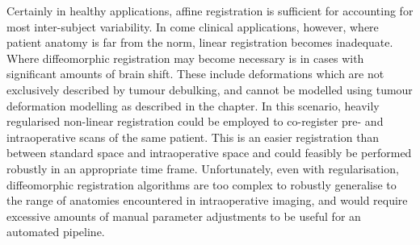 Certainly in healthy applications, affine registration is sufficient for accounting for most inter-subject variability.
In come clinical applications, however, where patient anatomy is far from the norm, linear registration becomes inadequate.
Where diffeomorphic registration may become necessary is in cases with significant amounts of brain shift.
These include deformations which are not exclusively described by tumour debulking, and cannot be modelled using tumour deformation modelling as described in the  chapter.
In this scenario, heavily regularised non-linear registration could be employed to co-register pre- and intraoperative scans of the same patient.
This is an easier registration than between standard space and intraoperative space and could feasibly be performed robustly in an appropriate time frame.
Unfortunately, even with regularisation, diffeomorphic registration algorithms are too complex to robustly generalise to the range of anatomies encountered in intraoperative imaging, and would require excessive amounts of manual parameter adjustments to be useful for an automated pipeline.
